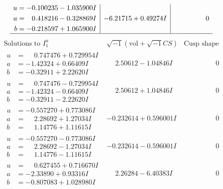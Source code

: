 \documentclass[1p]{elsarticle_modified}
\theoremstyle{definition}
\newcommand{\I}{\sqrt{-1}}
\begin{document}
$$\begin{array}{c|c|c}
\begin{aligned}
u &= -0.100235 - 1.035900 I \\
a &= \phantom{-}0.418216 - 0.328869 I \\
b &= -0.218597 + 1.065900 I\end{aligned}
 & -6.21715 + 0.49274 I & \phantom{-0.000000 } 0\\
 \hline 
 \end{array}$$\newpage$$\begin{array}{c|c|c}  
\text{Solutions to }I^u_{1}& \I (\text{vol} + \sqrt{-1}CS) & \text{Cusp shape}\\
 \hline 
\begin{aligned}
u &= \phantom{-}0.747476 + 0.729954 I \\
a &= -1.42324 + 0.66409 I \\
b &= -0.32911 + 2.22620 I\end{aligned}
 & \phantom{-}2.50612 - 1.04846 I & \phantom{-0.000000 } 0 \\ \hline\begin{aligned}
u &= \phantom{-}0.747476 - 0.729954 I \\
a &= -1.42324 - 0.66409 I \\
b &= -0.32911 - 2.22620 I\end{aligned}
 & \phantom{-}2.50612 + 1.04846 I & \phantom{-0.000000 } 0 \\ \hline\begin{aligned}
u &= -0.557270 + 0.773086 I \\
a &= \phantom{-}2.28692 + 1.27034 I \\
b &= \phantom{-}1.14776 + 1.11615 I\end{aligned}
 & -0.232614 + 0.596001 I & \phantom{-0.000000 } 0 \\ \hline\begin{aligned}
u &= -0.557270 - 0.773086 I \\
a &= \phantom{-}2.28692 - 1.27034 I \\
b &= \phantom{-}1.14776 - 1.11615 I\end{aligned}
 & -0.232614 - 0.596001 I & \phantom{-0.000000 } 0 \\ \hline\begin{aligned}
u &= \phantom{-}0.627455 + 0.716670 I \\
a &= -2.33890 + 0.93316 I \\
b &= -0.807083 + 1.028980 I\end{aligned}
 & \phantom{-}2.26284 - 6.40383 I & \phantom{-0.000000 } 0 \\ \hline\begin{aligned}

\end{aligned}
\end{array}$$
\end{document}
